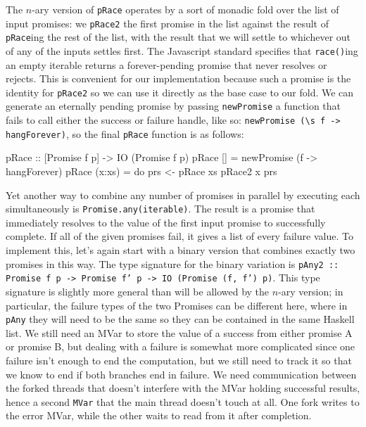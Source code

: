 \documentclass[12pt, english, letterpaper]{kuthesis}
\newcommand{\lit}[1]{\texttt{#1}}
\begin{document}

The \(n\)-ary version of \lit{pRace} operates by a sort of monadic fold over the list of input promises: we \lit{pRace2} the first promise in the list against the result of \lit{pRace}ing the rest of the list, with the result that we will settle to whichever out of any of the inputs settles first.  The Javascript standard specifies that \lit{race()}ing an empty iterable returns a forever-pending promise that never resolves or rejects.  This is convenient for our implementation because such a promise is the identity for \lit{pRace2} so we can use it directly as the base case to our fold.  We can generate an eternally pending promise by passing \lit{newPromise} a function that fails to call either the success or failure handle, like so: \verb|newPromise (\s f -> hangForever)|, so the final \lit{pRace} function is as follows:
\begin{code}
pRace :: [Promise f p] -> IO (Promise f p)
pRace [] = newPromise (\s f -> hangForever)
pRace (x:xs) = do
  prs <- pRace xs
  pRace2 x prs
\end{code}

Yet another way to combine any number of promises in parallel by executing each simultaneously is \lit{Promise.any(iterable)}.  The result is a promise that immediately resolves to the value of the first input promise to successfully complete.  If all of the given promises fail, it gives a list of every failure value.  To implement this, let's again start with a binary version that combines exactly two promises in this way.  The type signature for the binary variation is \lit{pAny2 :: Promise f p -> Promise f' p -> IO (Promise (f, f') p)}.  This type signature is slightly more general than will be allowed by the \(n\)-ary version; in particular, the failure types of the two Promises can be different here, where in \lit{pAny} they will need to be the same so they can be contained in the same Haskell list.  We still need an MVar to store the value of a success from either promise A or promise B, but dealing with a failure is somewhat more complicated since one failure isn't enough to end the computation, but we still need to track it so that we know to end if both branches end in failure.  We need communication between the forked threads that doesn't interfere with the MVar holding successful results, hence a second \lit{MVar} that the main thread doesn't touch at all.  One fork writes to the error MVar, while the other waits to read from it after completion.
\end{document}
